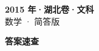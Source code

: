 \documentclass[zihao=-4, a4paper]{ctexart}
\begin{document}
\begin{center}
  {\Large\bfseries 2015 年·湖北卷·文科}\\[4pt]
  {\large 数学 · 简答版}
\end{center}
\medskip
{}

\clearpage
{}
\begin{center}{\Large\bfseries 答案速查}\end{center}
\medskip

\end{document}
